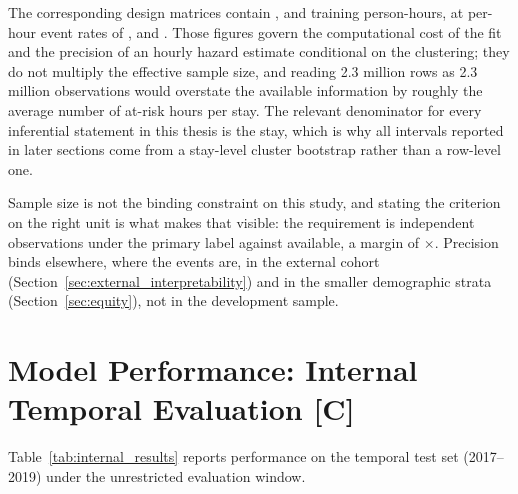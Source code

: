 The corresponding design matrices contain \pcNTrainPersonHA{},
\pcNTrainPersonHB{} and \pcNTrainPersonHC{} training person-hours, at per-hour
event rates of \pcPerHourRateA{}, \pcPerHourRateB{} and \pcPerHourRateC{}. Those
figures govern the computational cost of the fit and the precision of an hourly
hazard estimate conditional on the clustering; they do not multiply the
effective sample size, and reading 2.3 million rows as 2.3 million observations
would overstate the available information by roughly the average number of
at-risk hours per stay. The relevant denominator for every inferential
statement in this thesis is the stay, which is why all intervals reported in
later sections come from a stay-level cluster bootstrap rather than a row-level
one.

Sample size is not the binding constraint on this study, and stating the
criterion on the right unit is what makes that visible: the requirement is
\pcMinNRileyStayB{} independent observations under the primary label against
\pcNTrainStays{} available, a margin of \pcRileyMarginB$\times$. Precision binds
elsewhere, where the events are, in the external cohort
(Section~\ref{sec:external_interpretability}) and in the smaller demographic
strata (Section~\ref{sec:equity}), not in the development sample.



\section{Model Performance: Internal Temporal Evaluation \texorpdfstring{[C]}{[C]}}
\label{sec:internal_performance}

Table~\ref{tab:internal_results} reports performance on the temporal test set
(2017--2019) under the unrestricted evaluation window.

